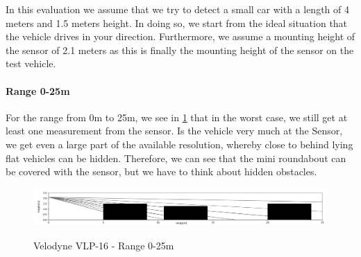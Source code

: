 \documentclass[11pt,oneside,openright]{mpreport}
\begin{document}

In this evaluation we assume that we try to detect a small car with a length of 4 meters and 1.5 meters height. In doing so, we start from
the ideal situation that the vehicle drives in your direction.
Furthermore, we assume a mounting height of the sensor of 2.1 meters as this is finally the mounting height of the sensor on the test vehicle.

\paragraph{Range 0-25m}

For the range from 0m to 25m, we see in \cref{velodyne_range_25} that in the worst case, we still get at least one measurement from the sensor. 
Is the vehicle very much at the
Sensor, we get even a large part of the available resolution, whereby close to behind lying flat vehicles can be hidden. Therefore, we can see 
that the mini roundabout can be covered with the sensor, but we have to think about hidden obstacles.

\begin{figure}[!ht]
\caption{Velodyne VLP-16 - Range 0-25m}
\includegraphics[width=\textwidth]{bilder/range_25.png}
\label{velodyne_range_25}
\end{figure}
\end{document}
